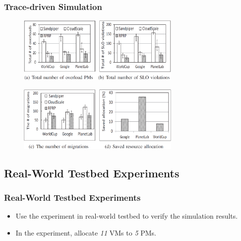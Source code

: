 \documentclass{beamer}
\begin{document}
	\begin{frame}
	\frametitle{Trace-driven Simulation}
		\begin{figure}[h!]
		\centering
		\includegraphics[width=0.7\textwidth]{./figure/eva2_1.PNG}
		\end{figure}
		\begin{figure}[h!]
		\centering
		\includegraphics[width=0.7\textwidth]{./figure/eva2_2.PNG}
		\end{figure}
	\end{frame}

\subsection{Real-World Testbed Experiments}
	\begin{frame}
	\frametitle{Real-World Testbed Experiments}
		\begin{itemize}
		\item Use the experiment in real-world testbed to verify the simulation results.
		\item In the experiment, allocate {\it 11} VMs to {\it 5} PMs.
		\end{itemize}
	\end{frame}
\end{document}
